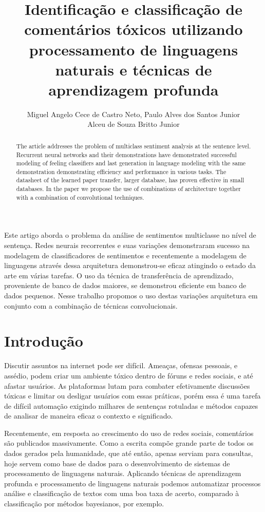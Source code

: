 \documentclass[12pt]{article}
\title{Identificação e classificação de comentários tóxicos utilizando processamento de linguagens naturais e técnicas de aprendizagem profunda}
\author{
    Miguel Angelo Cece de Castro Neto\inst{1},
    Paulo Alves dos Santos Junior\inst{1}\\
    Alceu de Souza Britto Junior\inst{2}
}
\begin{document}
\maketitle

\begin{abstract}
  The article addresses the problem of multiclass sentiment analysis at the sentence level. Recurrent neural networks and their demonstrations have demonstrated successful modeling of feeling classifiers and last generation in language modeling with the same demonstration demonstrating efficiency and performance in various tasks. The datasheet of the learned paper transfer, larger database, has proven effective in small databases. In the paper we propose the use of combinations of architecture together with a combination of convolutional techniques.
\end{abstract}

\begin{resumo}
  Este artigo aborda o problema da análise de sentimentos multiclasse no nível de sentença. Redes neurais recorrentes e suas variações demonstraram sucesso na modelagem de classificadores de sentimentos e recentemente a modelagem de linguagens através dessa arquitetura demonstrou-se eficaz atingindo o estado da arte em várias tarefas. O uso da técnica de transferência de aprendizado, proveniente de banco de dados maiores, se demonstrou eficiente em banco de dados pequenos. Nesse trabalho propomos o uso destas variações arquitetura em conjunto com a combinação de técnicas convolucionais.
\end{resumo}


\section{Introdução} \label{sec:introducao}

Discutir assuntos na internet pode ser difícil. Ameaças, ofensas pessoais, e assédio, podem criar um ambiente tóxico dentro de fóruns e redes sociais, e até afastar usuários. As plataformas lutam para combater efetivamente discussões tóxicas e limitar ou desligar usuários com essas práticas, porém essa é uma tarefa de difícil automação exigindo milhares de sentenças rotuladas e métodos capazes de analisar de maneira eficaz o contexto e significado.

Recentemente, em resposta ao crescimento do uso de redes sociais, comentários são publicados massivamente. Como a escrita compõe grande parte de todos os dados gerados pela humanidade, que até então, apenas serviam para consultas, hoje servem como base de dados para o desenvolvimento de sistemas de processamento de linguagens naturais. Aplicando técnicas de aprendizagem profunda e processamento de linguagens naturais podemos automatizar processos análise e classificação de textos com uma boa taxa de acerto, comparado à classificação por métodos bayesianos, por exemplo.
\end{document}
